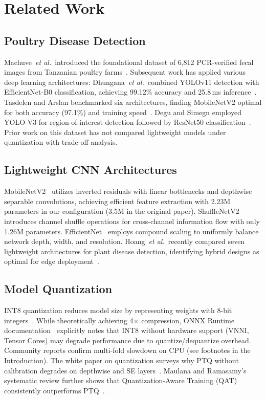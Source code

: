 \documentclass[conference,a4paper]{IEEEtran}
\begin{document}
\section{Related Work}

\subsection{Poultry Disease Detection}
Machuve~\textit{et al.}~introduced the foundational dataset of 6,812 PCR-verified fecal images from Tanzanian poultry farms~\cite{machuve2022}. Subsequent work has applied various deep learning architectures: Dhungana~\textit{et al.}~combined YOLOv11 detection with EfficientNet-B0 classification, achieving 99.12\% accuracy and 25.8\,ms inference~\cite{dhungana2025}. Tasdelen and Arslan benchmarked six architectures, finding MobileNetV2 optimal for both accuracy (97.1\%) and training speed~\cite{tasdelen2025}. Degu and Simegn employed YOLO-V3 for region-of-interest detection followed by ResNet50 classification~\cite{degu2023}. Prior work on this dataset has not compared lightweight models under quantization with trade-off analysis.

\subsection{Lightweight CNN Architectures}
MobileNetV2~\cite{mobilenetv2} utilizes inverted residuals with linear bottlenecks and depthwise separable convolutions, achieving efficient feature extraction with 2.23M parameters in our configuration (3.5M in the original paper). ShuffleNetV2~\cite{shufflenetv2} introduces channel shuffle operations for cross-channel information flow with only 1.26M parameters. EfficientNet~\cite{efficientnet} employs compound scaling to uniformly balance network depth, width, and resolution. Hoang~\textit{et al.}~recently compared seven lightweight architectures for plant disease detection, identifying hybrid designs as optimal for edge deployment~\cite{hoang2026}.

\subsection{Model Quantization}
INT8 quantization reduces model size by representing weights with 8-bit integers~\cite{jacob2018}. While theoretically achieving 4$\times$ compression, ONNX Runtime documentation~\cite{onnxruntime2024} explicitly notes that INT8 without hardware support (VNNI, Tensor Cores) may degrade performance due to quantize/dequantize overhead. Community reports confirm multi-fold slowdown on CPU (see footnotes in the Introduction). The white paper on quantization surveys why PTQ without calibration degrades on depthwise and SE layers~\cite{nagel2021}. Maulana and Ramasamy's systematic review further shows that Quantization-Aware Training (QAT) consistently outperforms PTQ~\cite{maulana2026}.
\end{document}
